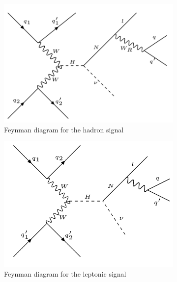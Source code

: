 \begin{figure}[h]
\centering
\begin{subfigure}{.5\textwidth}
  \centering
  \includegraphics[width=1\linewidth]{./Capitulos/Model/hadron_signal}
  \caption{Feynman diagram for the hadron signal}
  \label{signal_hadron_feynman}
\end{subfigure}%
\begin{subfigure}{.5\textwidth}
  \centering
  \includegraphics[width=1\linewidth]{./Capitulos/Model/leptonic_signal}
  \caption{Feynman diagram for the leptonic signal}
  \label{signal_leptonic_feynman}
\end{subfigure}
\caption{}
\label{signals}
\end{figure}


 
